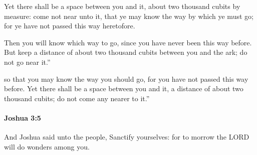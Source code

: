 			\begin{versebox}
					\item[BHS] 
					\item[ASV] Yet there shall be a space between you and it, about two thousand cubits by measure: come not near unto it, that ye may know the way by which ye must go; for ye have not passed this way heretofore.
					\item[NIV] Then you will know which way to go, since you have never been this way before. But keep a distance of about two thousand cubits between you and the ark; do not go near it.”
					\item[NRSV] so that you may know the way you should go, for you have not passed this way before. Yet there shall be a space between you and it, a distance of about two thousand cubits; do not come any nearer to it.”
			\end{versebox}

		\paragraph{Joshua 3:5} %
			\label{JOSHUA-3-5}

			And Joshua said unto the people, Sanctify yourselves: for to morrow the LORD will do wonders among you.

